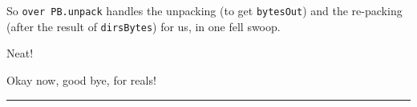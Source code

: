 \documentclass[]{article}
\newenvironment{Shaded}{}{}
\newcommand{\OtherTok}[1]{\textcolor[rgb]{0.00,0.44,0.13}{{#1}}}
\newcommand{\FunctionTok}[1]{\textcolor[rgb]{0.02,0.16,0.49}{{#1}}}
\newcommand{\NormalTok}[1]{{#1}}
\begin{document}
\begin{Shaded}
\end{Shaded}

So \texttt{over\ PB.unpack} handles the unpacking (to get
\texttt{bytesOut}) and the re-packing (after the result of
\texttt{dirsBytes}) for us, in one fell swoop.

Neat!

Okay now, good bye, for reals!

\begin{center}\rule{0.5\linewidth}{\linethickness}\end{center}
\end{document}
